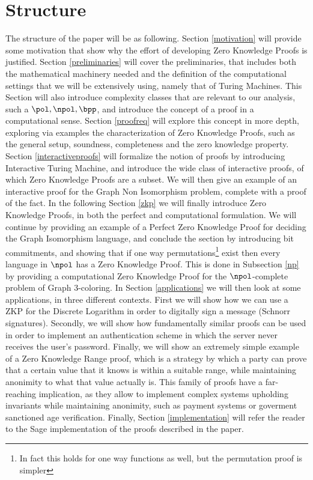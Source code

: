 \documentclass{article}
\begin{document}
\section{Structure}
The structure of the paper will be as following. Section \ref{motivation} will provide some motivation that show why
the effort of developing Zero Knowledge Proofs is justified. Section \ref{preliminaries} will cover the preliminaries,
that includes both the mathematical machinery needed and the definition of the computational settings that we will
be extensively using, namely that of Turing Machines. This Section will also introduce complexity classes that are
relevant to our analysis, such a $\pol, \npol, \bpp$, and introduce the concept of a proof in a computational sense.
Section \ref{proofreq} will explore this concept in more depth, exploring via examples the characterization of
Zero Knowledge Proofs, such as the general setup, soundness, completeness and the zero knowledge property.
Section \ref{interactiveproofs} will formalize the notion of proofs by introducing Interactive Turing Machine, and
introduce the wide class of interactive proofs, of which Zero Knowledge Proofs are a subset. We will then give an
example of an interactive proof for the Graph Non Isomorphism problem, complete with a proof of the fact.
In the following Section \ref{zkp} we will finally introduce Zero Knowledge Proofs, in both the perfect and computational
formulation. We will continue by providing an example of a Perfect Zero Knowledge Proof for deciding the Graph Isomorphism
language, and conclude the section by introducing bit commitments, and showing that if one way permutations\footnote{In fact this holds for one way functions as well, but the permutation proof is simpler} exist
then every language in $\npol$ has a Zero Knowledge Proof. This is done in Subsection \ref{np} by providing a
computational Zero Knowledge Proof for the $\npol$-complete problem of Graph 3-coloring.
In Section \ref{applications} we will then look at some applications, in three different contexts. First we will
show how we can use a ZKP for the Discrete Logarithm in order to digitally sign a message (Schnorr signatures). Secondly,
we will show how fundamentally similar proofs can be used in order to implement an authentication scheme in which the
server never receives the user's password. Finally, we will show an extremely simple example of a Zero Knowledge Range
proof, which is a strategy by which a party can prove that a certain value that it knows is within a suitable range, while
maintaining anonimity to what that value actually is. This family of proofs have a far-reaching implication, as they allow
to implement complex systems upholding invariants while maintaining anonimity, such as payment systems or goverment sanctioned
age verification. Finally, Section \ref{implementation} will refer the reader to the Sage implementation of the proofs described
in the paper.
\end{document}
